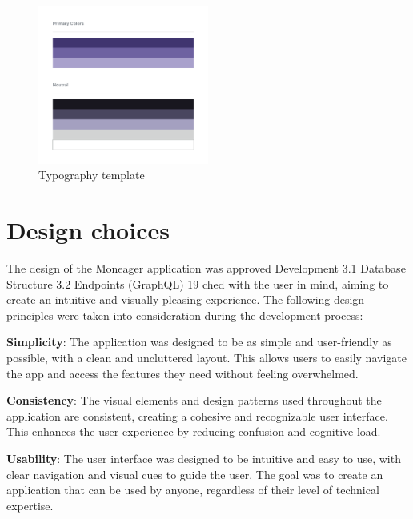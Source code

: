 \begin{figure}[htbp]
  \centering
  \includegraphics[width=0.5\textwidth]{Graphics/Design/Color Pallet.png}
  \caption{Typography template}
\end{figure}




\section{Design choices}\label{sect:description}


\hspace{\parindent}The design of the Moneager application was approved Development
3.1 Database Structure
3.2 Endpoints (GraphQL)
19
ched with the user in mind, aiming to create an intuitive and visually pleasing experience. The following design principles were taken into consideration during the development process:

\hspace{\parindent} \textbf{Simplicity}: The application was designed to be as simple and user-friendly as possible, with a clean and uncluttered layout. This allows users to easily navigate the app and access the features they need without feeling overwhelmed.

\hspace{\parindent} \textbf{Consistency}: The visual elements and design patterns used throughout the application are consistent, creating a cohesive and recognizable user interface. This enhances the user experience by reducing confusion and cognitive load.

\hspace{\parindent} \textbf{Usability}: The user interface was designed to be intuitive and easy to use, with clear navigation and visual cues to guide the user. The goal was to create an application that can be used by anyone, regardless of their level of technical expertise.


